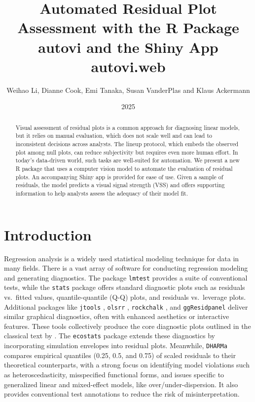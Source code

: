 \documentclass[
doublespace,
  times]{anzsauth}
\title{Automated Residual Plot Assessment with the R Package autovi and
the Shiny App autovi.web}
\author{
Weihao Li\addressnum{1},
Dianne Cook\addressnum{1},
Emi Tanaka\addressnum{2},
Susan VanderPlas\addressnum{3} and
Klaus Ackermann\addressnum{1}
}
\affiliation{
Monash University,
The Australian National University and
University of Nebraska
}
\date{2025}
\begin{document}
\begin{abstract}
Visual assessment of residual plots is a common approach for diagnosing
linear models, but it relies on manual evaluation, which does not scale
well and can lead to inconsistent decisions across analysts. The lineup
protocol, which embeds the observed plot among null plots, can reduce
subjectivity but requires even more human effort. In today's data-driven
world, such tasks are well-suited for automation. We present a new R
package that uses a computer vision model to automate the evaluation of
residual plots. An accompanying Shiny app is provided for ease of use.
Given a sample of residuals, the model predicts a visual signal strength
(VSS) and offers supporting information to help analysts assess the
adequacy of their model fit.
\end{abstract}

          

\maketitle


\section{Introduction}\label{sec-autovi-introduction}

Regression analysis is a widely used statistical modeling technique for
data in many fields. There is a vast array of software for conducting
regression modeling and generating diagnostics. The package
\texttt{lmtest} \citep{lmtest} provides a suite of conventional tests,
while the \texttt{stats} package \citep{stats} offers standard
diagnostic plots such as residuals vs.~fitted values, quantile-quantile
(Q-Q) plots, and residuals vs.~leverage plots. Additional packages like
\texttt{jtools} \citep{jtools}, \texttt{olsrr} \citep{olsrr},
\texttt{rockchalk} \citep{rockchalk}, and \texttt{ggResidpanel}
\citep{ggresidpanel} deliver similar graphical diagnostics, often with
enhanced aesthetics or interactive features. These tools collectively
produce the core diagnostic plots outlined in the classical text by
\citet{cook1982residuals}. The \texttt{ecostats} package
\citep{warton_global_2023} extends these diagnostics by incorporating
simulation envelopes into residual plots. Meanwhile, \texttt{DHARMa}
\citep{dharma} compares empirical quantiles (0.25, 0.5, and 0.75) of
scaled residuals to their theoretical counterparts, with a strong focus
on identifying model violations such as heteroscedasticity, misspecified
functional forms, and issues specific to generalized linear and
mixed-effect models, like over/under-dispersion. It also provides
conventional test annotations to reduce the risk of misinterpretation.
\end{document}
